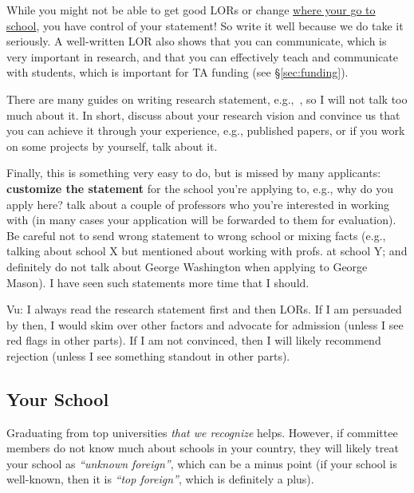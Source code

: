 \documentclass[11pt]{article}
\begin{document}
While you might not be able to get good LORs or change
\hyperref[sec:your-school]{where your go to school}, you have control of your
statement! So write it well because we do take it seriously.
A well-written LOR also shows that you can communicate, which is very important in research, and that you can effectively teach and communicate with students, which is important for TA funding (see \S\ref{sec:funding}).

There are many guides on writing research statement, e.g.,~\cite{blattman2022writing},
so I will not talk too much about it. In short, discuss about your research vision and convince us that you can achieve it through your experience, e.g., published papers, or if you work on some projects by yourself, talk about it.

Finally, this is something very easy to do, but is missed by many
applicants: \textbf{customize the statement} for the school you're applying to,
e.g., why do you apply here? talk about a couple of professors who you're interested in working with (in many cases your application will be forwarded to them for evaluation).
Be careful not to send wrong statement to wrong school or mixing
facts (e.g., talking about school X but mentioned about working with
profs. at school Y; and definitely do not talk about George Washington when applying to George Mason). I have seen such statements more time that I
should.


\begin{tcolorbox}[left=1pt,right=1pt,top=1pt,bottom=1pt]
Vu: I always read the research statement first and then LORs. If I am
persuaded by then, I would skim over other factors and advocate for
admission (unless I see red flags in other parts). If I am not
convinced, then I will likely recommend rejection (unless I see
something standout in other parts).
\end{tcolorbox}


\subsection{Your School}\label{sec:your-school}

Graduating from top universities \emph{that we recognize} helps.
However, if committee members do not know much about schools in your country, they will likely treat your school as
\emph{``unknown foreign''}, which can be a minus point (if your school is well-known, then it is \emph{``top foreign''}, which is definitely a plus).
\end{document}
